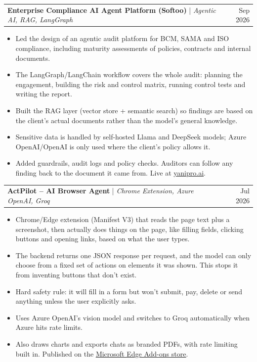 \documentclass[letterpaper,11pt]{article}
\makeatletter
\newcommand{\resumeItem}[1]{
  \item\small{
    {#1 \vspace{-2pt}}
  }
}
\newcommand{\resumeProjectHeading}[2]{
    \item
    \begin{tabular*}{0.97\textwidth}{l@{\extracolsep{\fill}}r}
      \small#1~ & #2 \\
    \end{tabular*}\vspace{-7pt}
}
\newcommand{\resumeItemListStart}{\begin{itemize}}
\newcommand{\resumeItemListEnd}{\end{itemize}\vspace{-5pt}}
\makeatother
\begin{document}
      \resumeProjectHeading
          {\textbf{Enterprise Compliance AI Agent Platform (Softoo)} | \emph{Agentic AI, RAG, LangGraph}}{Sep 2026}
          \resumeItemListStart
            \resumeItem{Led the design of an agentic audit platform for BCM, SAMA and ISO compliance, including maturity assessments of policies, contracts and internal documents.}
            \resumeItem{The LangGraph/LangChain workflow covers the whole audit: planning the engagement, building the risk and control matrix, running control tests and writing the report.}
            \resumeItem{Built the RAG layer (vector store + semantic search) so findings are based on the client's actual documents rather than the model's general knowledge.}
            \resumeItem{Sensitive data is handled by self-hosted Llama and DeepSeek models; Azure OpenAI/OpenAI is only used where the client's policy allows it.}
            \resumeItem{Added guardrails, audit logs and policy checks. Auditors can follow any finding back to the document it came from. Live at \href{https://yanipro.ai/}{\underline{yanipro.ai}}.}
          \resumeItemListEnd

      \resumeProjectHeading
          {\textbf{ActPilot -- AI Browser Agent} | \emph{Chrome Extension, Azure OpenAI, Groq}}{Jul 2026}
          \resumeItemListStart
            \resumeItem{Chrome/Edge extension (Manifest V3) that reads the page text plus a screenshot, then actually does things on the page, like filling fields, clicking buttons and opening links, based on what the user types.}
            \resumeItem{The backend returns one JSON response per request, and the model can only choose from a fixed set of actions on elements it was shown. This stops it from inventing buttons that don't exist.}
            \resumeItem{Hard safety rule: it will fill in a form but won't submit, pay, delete or send anything unless the user explicitly asks.}
            \resumeItem{Uses Azure OpenAI's vision model and switches to Groq automatically when Azure hits rate limits.}
            \resumeItem{Also draws charts and exports chats as branded PDFs, with rate limiting built in. Published on the \href{https://microsoftedge.microsoft.com/addons/detail/actpilot/kbaigcjodbggmfampikpgmopjojkomid}{\underline{Microsoft Edge Add-ons store}}.}
          \resumeItemListEnd
\end{document}
